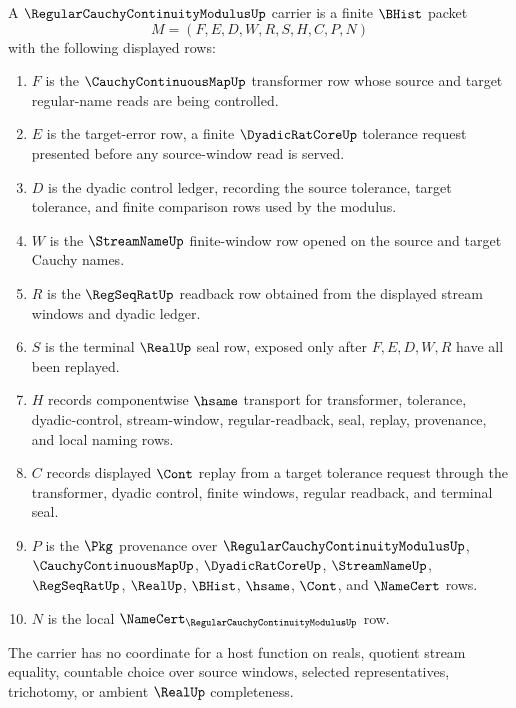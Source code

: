 \begin{definition}
\label{def:regular-cauchy-continuity-modulus-carrier}
A $\RegularCauchyContinuityModulusUp$ carrier is a finite $\BHist$ packet
$$
M=(F,E,D,W,R,S,H,C,P,N)
$$
with the following displayed rows:
\begin{enumerate}
\item $F$ is the $\CauchyContinuousMapUp$ transformer row whose source and target regular-name reads are being controlled.
\item $E$ is the target-error row, a finite $\DyadicRatCoreUp$ tolerance request presented before any source-window read is served.
\item $D$ is the dyadic control ledger, recording the source tolerance, target tolerance, and finite comparison rows used by the modulus.
\item $W$ is the $\StreamNameUp$ finite-window row opened on the source and target Cauchy names.
\item $R$ is the $\RegSeqRatUp$ readback row obtained from the displayed stream windows and dyadic ledger.
\item $S$ is the terminal $\RealUp$ seal row, exposed only after $F,E,D,W,R$ have all been replayed.
\item $H$ records componentwise $\hsame$ transport for transformer, tolerance, dyadic-control, stream-window, regular-readback, seal, replay, provenance, and local naming rows.
\item $C$ records displayed $\Cont$ replay from a target tolerance request through the transformer, dyadic control, finite windows, regular readback, and terminal seal.
\item $P$ is the $\Pkg$ provenance over $\RegularCauchyContinuityModulusUp$, $\CauchyContinuousMapUp$, $\DyadicRatCoreUp$, $\StreamNameUp$, $\RegSeqRatUp$, $\RealUp$, $\BHist$, $\hsame$, $\Cont$, and $\NameCert$ rows.
\item $N$ is the local $\NameCert_{\RegularCauchyContinuityModulusUp}$ row.
\end{enumerate}
The carrier has no coordinate for a host function on reals, quotient stream equality, countable choice over source windows, selected representatives, trichotomy, or ambient $\RealUp$ completeness.
\end{definition}

